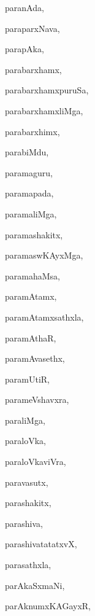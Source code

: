 \begin{multicols}{3}
{\noindent
{paranAda}, \pageref{paranAda}

\noindent
{paraparxNava}, \pageref{paraparxNava}

\noindent
{parapAka}, \pageref{parapAka}

\noindent
{parabarxhamx}, \pageref{parabarxhamx}

\noindent
{parabarxhamxpuruSa}, \pageref{parabarxhamxpuruSa}

\noindent
{parabarxhamxliMga}, \pageref{parabarxhamxliMga}

\noindent
{parabarxhimx}, \pageref{parabarxhimx}

\noindent
{parabiMdu}, \pageref{parabiMdu}

\noindent
{paramaguru}, \pageref{paramaguru}

\noindent
{paramapada}, \pageref{paramapada}

\noindent
{paramaliMga}, \pageref{paramaliMga}

\noindent
{paramashakitx}, \pageref{paramashakitx}

\noindent
{paramaswKAyxMga}, \pageref{paramaswKAyxMga}

\noindent
{paramahaMsa}, \pageref{paramahaMsa}

\noindent
{paramAtamx}, \pageref{paramAtamx}

\noindent
{paramAtamxsathxla}, \pageref{paramAtamxsathxla}

\noindent
{paramAthaR}, \pageref{paramAthaR}

\noindent
{paramAvasethx}, \pageref{paramAvasethx}

\noindent
{paramUtiR}, \pageref{paramUtiR}

\noindent
{parameVshavxra}, \pageref{parameVshavxra}

\noindent
{paraliMga}, \pageref{paraliMga}

\noindent
{paraloVka}, \pageref{paraloVka}

\noindent
{paraloVkaviVra}, \pageref{paraloVkaviVra}

\noindent
{paravasutx}, \pageref{paravasutx}

\noindent
{parashakitx}, \pageref{parashakitx}

\noindent
{parashiva}, \pageref{parashiva}

\noindent
{parashivatatatxvX}, \pageref{parashivatatatxvX}

\noindent
{parasathxla}, \pageref{parasathxla}

\noindent
{parAkaSxmaNi}, \pageref{parAkaSxmaNi}

\noindent
{parAknumxKAGayxR}, \pageref{parAknumxKAGayxR}

}
\end{multicols}
